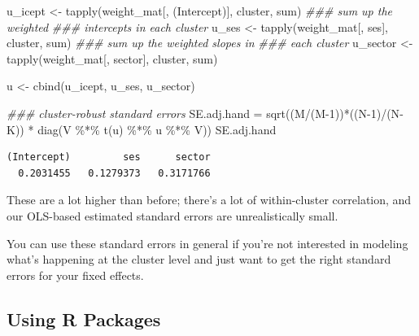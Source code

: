 \documentclass[
  letterpaper,
  DIV=11,
  numbers=noendperiod]{scrreprt}
\newenvironment{Shaded}{\begin{snugshade}}{\end{snugshade}}
\newcommand{\DecValTok}[1]{\textcolor[rgb]{0.25,0.63,0.44}{#1}}
\newcommand{\DocumentationTok}[1]{\textcolor[rgb]{0.73,0.13,0.13}{\textit{#1}}}
\newcommand{\FunctionTok}[1]{\textcolor[rgb]{0.02,0.16,0.49}{#1}}
\newcommand{\NormalTok}[1]{\textcolor[rgb]{0.00,0.44,0.13}{#1}}
\newcommand{\OtherTok}[1]{\textcolor[rgb]{0.00,0.44,0.13}{#1}}
\newcommand{\SpecialCharTok}[1]{\textcolor[rgb]{0.25,0.44,0.63}{#1}}
\newcommand{\StringTok}[1]{\textcolor[rgb]{0.25,0.44,0.63}{#1}}
\begin{document}
\begin{Shaded}
\begin{Highlighting}[]
\NormalTok{u\_icept }\OtherTok{\textless{}{-}} \FunctionTok{tapply}\NormalTok{(weight\_mat[, }\StringTok{\textquotesingle{}(Intercept)\textquotesingle{}}\NormalTok{], cluster, sum) }\DocumentationTok{\#\#\# sum up the weighted }
                                                             \DocumentationTok{\#\#\# intercepts in each cluster}
\NormalTok{u\_ses }\OtherTok{\textless{}{-}} \FunctionTok{tapply}\NormalTok{(weight\_mat[, }\StringTok{\textquotesingle{}ses\textquotesingle{}}\NormalTok{], cluster, sum) }\DocumentationTok{\#\#\# sum up the weighted slopes in }
                                                       \DocumentationTok{\#\#\# each cluster}
\NormalTok{u\_sector }\OtherTok{\textless{}{-}} \FunctionTok{tapply}\NormalTok{(weight\_mat[, }\StringTok{\textquotesingle{}sector\textquotesingle{}}\NormalTok{], cluster, sum)}

\NormalTok{u }\OtherTok{\textless{}{-}} \FunctionTok{cbind}\NormalTok{(u\_icept, u\_ses, u\_sector)}

\DocumentationTok{\#\#\# cluster{-}robust standard errors}
\NormalTok{SE.adj.hand }\OtherTok{=} \FunctionTok{sqrt}\NormalTok{((M}\SpecialCharTok{/}\NormalTok{(M}\DecValTok{{-}1}\NormalTok{))}\SpecialCharTok{*}\NormalTok{((N}\DecValTok{{-}1}\NormalTok{)}\SpecialCharTok{/}\NormalTok{(N}\SpecialCharTok{{-}}\NormalTok{K)) }\SpecialCharTok{*} \FunctionTok{diag}\NormalTok{(V }\SpecialCharTok{\%*\%} \FunctionTok{t}\NormalTok{(u) }\SpecialCharTok{\%*\%}\NormalTok{ u }\SpecialCharTok{\%*\%}\NormalTok{ V)) }
\NormalTok{SE.adj.hand}
\end{Highlighting}
\end{Shaded}

\begin{verbatim}
(Intercept)         ses      sector 
  0.2031455   0.1279373   0.3171766 
\end{verbatim}

These are a lot higher than before; there's a lot of within-cluster
correlation, and our OLS-based estimated standard errors are
unrealistically small.

You can use these standard errors in general if you're not interested in
modeling what's happening at the cluster level and just want to get the
right standard errors for your fixed effects.

\hypertarget{using-r-packages}{%
\subsection{Using R Packages}\label{using-r-packages}}
\end{document}
